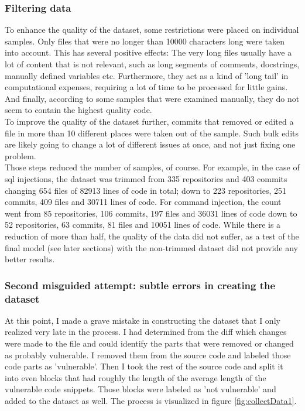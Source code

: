 \documentclass[
a4paper,
pagesize,
pdftex,
12pt,
twoside, %
BCOR=5mm, %
ngerman,
fleqn,
final,
]{scrartcl}
\begin{document}
	\subsubsection{Filtering data}
	To enhance the quality of the dataset, some restrictions were placed on individual samples. Only files that were no longer than 10000 characters long were taken into account. This has several positive effects: The very long files usually have a lot of content that is not relevant, such as long segments of comments, docstrings, manually defined variables etc. Furthermore, they act as a kind of 'long tail' in computational expenses, requiring a lot of time to be processed for little gains. And finally, according to some samples that were examined manually, they do not seem to contain the highest quality code.\\
	To improve the quality of the dataset further, commits that removed or edited a file in more than 10 different places were taken out of the sample. Such bulk edits are likely going to change a lot of different issues at once, and not just fixing one problem.\\
	Those steps reduced the number of samples, of course. For example, in the case of sql injections, the dataset was trimmed from 335 repositories and 403 commits changing 654 files of 82913 lines of code in total; down to 223 repositories, 251 commits, 409 files and 30711 lines of code. For command injection, the count went from 85 repositories, 106 commits, 197 files and 36031 lines of code down to 52 repositories, 63 commits, 81 files and 10051 lines of code. While there is a reduction of more than half, the quality of the data did not suffer, as a test of the final model (see later sections) with the non-trimmed dataset did not provide any better results.
	
	\subsubsection{Second misguided attempt: subtle errors in creating the dataset} %
	At this point, I made a grave mistake in constructing the dataset that I only realized very late in the process. I had determined from the diff which changes were made to the file and could identify the parts that were removed or changed as probably vulnerable. I removed them from the source code and labeled those code parts as 'vulnerable'. Then I took the rest of the source code and split it into even blocks that had roughly the length of the average length of the vulnerable code snippets. Those blocks were labeled as 'not vulnerable' and added to the dataset as well. The process is visualized in figure \ref{fig:collectData1}.
	
\end{document}

